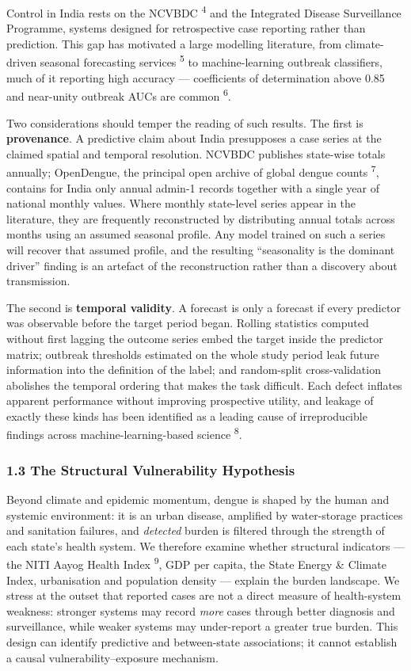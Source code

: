 \documentclass[
  10pt,
  twocolumn]{article}
\begin{document}
Control in India rests on the NCVBDC \textsuperscript{4} and the
Integrated Disease Surveillance Programme, systems designed for
retrospective case reporting rather than prediction. This gap has
motivated a large modelling literature, from climate-driven seasonal
forecasting services \textsuperscript{5} to machine-learning outbreak
classifiers, much of it reporting high accuracy --- coefficients of
determination above 0.85 and near-unity outbreak AUCs are common
\textsuperscript{6}.

Two considerations should temper the reading of such results. The first
is \textbf{provenance}. A predictive claim about India presupposes a
case series at the claimed spatial and temporal resolution. NCVBDC
publishes state-wise totals annually; OpenDengue, the principal open
archive of global dengue counts \textsuperscript{7}, contains for India
only annual admin-1 records together with a single year of national
monthly values. Where monthly state-level series appear in the
literature, they are frequently reconstructed by distributing annual
totals across months using an assumed seasonal profile. Any model
trained on such a series will recover that assumed profile, and the
resulting ``seasonality is the dominant driver'' finding is an artefact
of the reconstruction rather than a discovery about transmission.

The second is \textbf{temporal validity}. A forecast is only a forecast
if every predictor was observable before the target period began.
Rolling statistics computed without first lagging the outcome series
embed the target inside the predictor matrix; outbreak thresholds
estimated on the whole study period leak future information into the
definition of the label; and random-split cross-validation abolishes the
temporal ordering that makes the task difficult. Each defect inflates
apparent performance without improving prospective utility, and leakage
of exactly these kinds has been identified as a leading cause of
irreproducible findings across machine-learning-based science
\textsuperscript{8}.

\subsubsection{1.3 The Structural Vulnerability
Hypothesis}\label{the-structural-vulnerability-hypothesis}

Beyond climate and epidemic momentum, dengue is shaped by the human and
systemic environment: it is an urban disease, amplified by water-storage
practices and sanitation failures, and \emph{detected} burden is
filtered through the strength of each state's health system. We
therefore examine whether structural indicators --- the NITI Aayog
Health Index \textsuperscript{9}, GDP per capita, the State Energy \&
Climate Index, urbanisation and population density --- explain the
burden landscape. We stress at the outset that reported cases are not a
direct measure of health-system weakness: stronger systems may record
\emph{more} cases through better diagnosis and surveillance, while
weaker systems may under-report a greater true burden. This design can
identify predictive and between-state associations; it cannot establish
a causal vulnerability--exposure mechanism.
\end{document}
